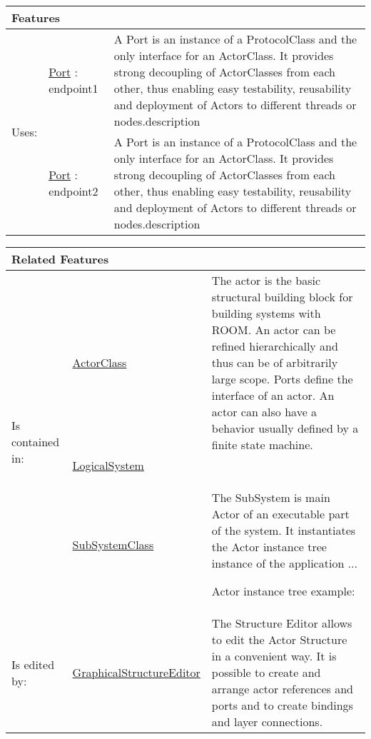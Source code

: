			
			\vspace{\baselineskip}
			\begingroup
			\renewcommand{\arraystretch}{1.8} %
			\parbox{\textwidth}{
			\begin{longtable}{l l p{}}
				\multicolumn{2}{l}{\textbf{\large Features}} & \\
				\hline
			\multirow{2}{*}{Uses:} & \tabitem \hyperlink{ref:Port}{Port} : endpoint1 & A Port is an instance of a ProtocolClass and the only interface for an ActorClass. It provides strong decoupling of ActorClasses from each other, thus enabling easy testability, reusability and deployment of Actors to different threads or nodes.description \\
			& \tabitem \hyperlink{ref:Port}{Port} : endpoint2 & A Port is an instance of a ProtocolClass and the only interface for an ActorClass. It provides strong decoupling of ActorClasses from each other, thus enabling easy testability, reusability and deployment of Actors to different threads or nodes.description  \\
			\hline
			\end{longtable}	
			}
			\endgroup
			\vspace{\baselineskip}
			
			\vspace{\baselineskip}
			\begingroup
			\renewcommand{\arraystretch}{1.8} %
			\parbox{\textwidth}{
			\begin{longtable}{l l p{}}
				\multicolumn{2}{l}{\textbf{\large Related Features}} & \\
				\hline
			\multirow{3}{*}{Is contained in:} & \tabitem \hyperlink{ref:ActorClass}{ActorClass}  & The actor is the basic structural building block for building systems with ROOM. An actor can be refined hierarchically and thus can be of arbitrarily large scope. Ports define the interface of an actor. An actor can also have a behavior usually defined by a finite state machine. \\
			& \tabitem \hyperlink{ref:LogicalSystem}{LogicalSystem}  &  \\
			& \tabitem \hyperlink{ref:SubSystemClass}{SubSystemClass}  & The SubSystem is main Actor of an executable part of the system. It instantiates the Actor instance tree instance of the application ...
				
				Actor instance tree example:
			 \\
			\hline
			Is edited by: & \tabitem \hyperlink{ref:GraphicalStructureEditor}{GraphicalStructureEditor}  & The Structure Editor allows to edit the Actor Structure in a convenient way. It is possible to create and arrange actor references and ports and to create bindings and layer connections.\\
			\hline
			\end{longtable}	
			}
			\endgroup
			\vspace{\baselineskip}
			
